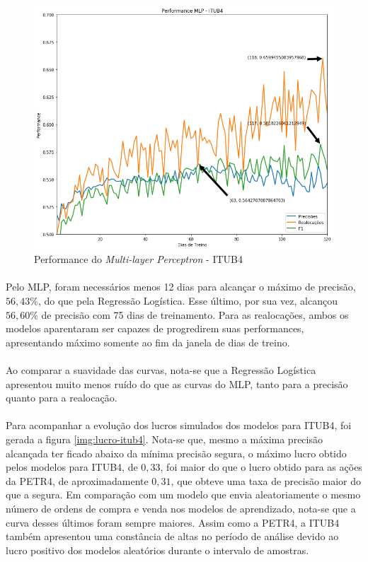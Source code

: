 \documentclass[grad,numbers]{coppe}
\begin{document}
            \begin{figure}[h!]
                \caption{Performance do \textit{Multi-layer Perceptron} - ITUB4}
                \label{img:performance-mlp-itub4}
                \includegraphics[width=13.1cm]{performance-mlp-itub4.png}
                \centering
            \end{figure}
        
        \paragraph{}Pelo MLP, foram necessários menos 12 dias para alcançar o máximo de precisão, $56,43\%$, do que pela Regressão Logística. Esse último, por sua vez, alcançou $56,60\%$ de precisão com 75 dias de treinamento. Para as realocações, ambos os modelos aparentaram ser capazes de progredirem suas performances, apresentando máximo somente ao fim da janela de dias de treino.
        
        \paragraph{}Ao comparar a suavidade das curvas, nota-se que a Regressão Logística apresentou muito menos ruído do que as curvas do MLP, tanto para a precisão quanto para a realocação.
        
        \paragraph{}Para acompanhar a evolução dos lucros simulados dos modelos para ITUB4, foi gerada a figura \ref{img:lucro-itub4}. Nota-se que, mesmo a máxima precisão alcançada ter ficado abaixo da mínima precisão segura, o máximo lucro obtido pelos modelos para ITUB4, de $0,33$, foi maior do que o lucro obtido para as ações da PETR4, de aproximadamente $0,31$, que obteve uma taxa de precisão maior do que a segura. Em comparação com um modelo que envia aleatoriamente o mesmo número de ordens de compra e venda nos modelos de aprendizado, nota-se que a curva desses últimos foram sempre maiores. Assim como a PETR4, a ITUB4 também apresentou uma constância de altas no período de análise devido ao lucro positivo dos modelos aleatórios durante o intervalo de amostras.
        
\end{document}
